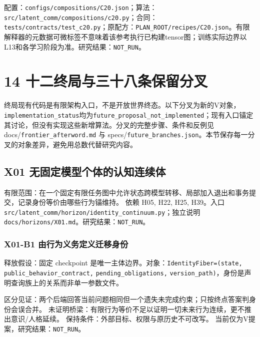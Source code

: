 \documentclass[
  10pt,
]{article}
\begin{document}
配置：{\small\nolinkurl{configs/compositions/C20.json}}；算法：{\small\nolinkurl{src/latent_comm/compositions/c20.py}}；合同：{\small\nolinkurl{tests/contracts/test_c20.py}}；原配方：{\small\nolinkurl{PLAN_ROOT/recipes/C20.json}}。有限解释器的元数据可微标签不意味着该参考执行已构建tensor图；训练实际边界以L13和各学习阶段为准。研究结果：\nolinkurl{NOT_RUN}。

\section{14
十二终局与三十八条保留分叉}\label{ux5341ux4e8cux7ec8ux5c40ux4e0eux4e09ux5341ux516bux6761ux4fddux7559ux5206ux53c9}

终局现有代码是有限架构入口，不是开放世界终态。以下分叉为新的V对象，\nolinkurl{implementation_status}均为\nolinkurl{future_proposal_not_implemented}；现有入口锚定其讨论，但没有实现这些新增算法。分叉的完整步骤、条件和反例见
docs/\nolinkurl{frontier_afterword.md} 与
specs/\nolinkurl{future_branches.json}。本节保存每一分叉的对象差异，避免用总数代替研究内容。

\subsection{X01
无固定模型个体的认知连续体}\label{x01-ux65e0ux56faux5b9aux6a21ux578bux4e2aux4f53ux7684ux8ba4ux77e5ux8fdeux7eedux4f53}

有限范围：在一个固定有限任务图中允许状态跨模型转移、局部加入退出和事务提交，记录身份等价由哪些行为锚维持。
依赖 H05, H22, H25, H39。入口
{\small\nolinkurl{src/latent_comm/horizon/identity_continuum.py}}；独立说明
{\small\nolinkurl{docs/horizons/X01.md}}。研究结果：\nolinkurl{NOT_RUN}。

\subsubsection{X01-B1
由行为义务定义迁移身份}\label{x01-b1-ux7531ux884cux4e3aux4e49ux52a1ux5b9aux4e49ux8fc1ux79fbux8eabux4efd}

释放假设：固定 checkpoint
是唯一主体边界。对象：\nolinkurl{IdentityFiber=(state,}
\nolinkurl{public_behavior_contract,} \nolinkurl{pending_obligations,}
\nolinkurl{version_path)}，身份是声明查询族上的关系而非单一参数文件。

区分见证：两个后端回答当前问题相同但一个遗失未完成约束；只按终点答案判身份会误合并。
未证明桥梁：有限行为等价不足以证明一切未来行为连续，更不推出意识/人格延续。
保持条件：外部目标、权限与原历史不可改写。
当前仅为V提案，研究结果：\nolinkurl{NOT_RUN}。
\end{document}
